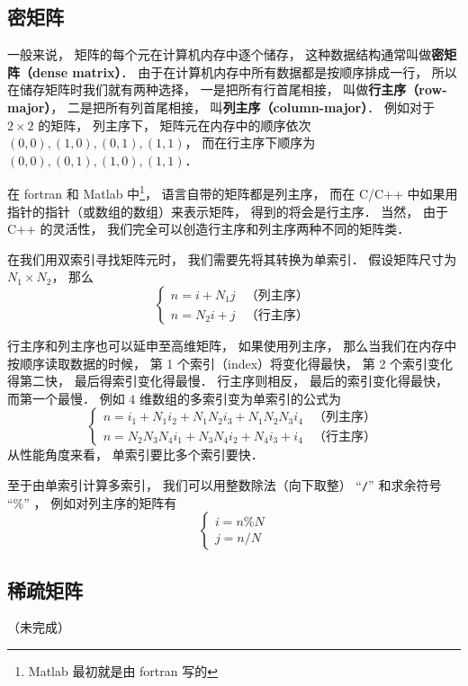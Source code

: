 
\subsection{密矩阵}
一般来说， 矩阵的每个元在计算机内存中逐个储存， 这种数据结构通常叫做\textbf{密矩阵（dense matrix）}． 由于在计算机内存中所有数据都是按顺序排成一行， 所以在储存矩阵时我们就有两种选择， 一是把所有行首尾相接， 叫做\textbf{行主序（row-major）}， 二是把所有列首尾相接， 叫\textbf{列主序（column-major）}． 例如对于 $2 \times 2$ 的矩阵， 列主序下， 矩阵元在内存中的顺序依次 $(0, 0), (1, 0), (0, 1), (1, 1)$， 而在行主序下顺序为 $(0, 0), (0, 1), (1, 0), (1, 1)$．

在 fortran 和 Matlab 中\footnote{Matlab 最初就是由 fortran 写的}， 语言自带的矩阵都是列主序， 而在 C/C++ 中如果用指针的指针（或数组的数组）来表示矩阵， 得到的将会是行主序． 当然， 由于 C++ 的灵活性， 我们完全可以创造行主序和列主序两种不同的矩阵类．

在我们用双索引寻找矩阵元时， 我们需要先将其转换为单索引． 假设矩阵尺寸为 $N_1 \times N_2$， 那么
\begin{equation}
\begin{cases}
n = i + N_1 j  &\text{（列主序）}\\
n = N_2 i + j  &\text{（行主序）}
\end{cases}
\end{equation}

行主序和列主序也可以延申至高维矩阵， 如果使用列主序， 那么当我们在内存中按顺序读取数据的时候， 第 1 个索引（index）将变化得最快， 第 2 个索引变化得第二快， 最后得索引变化得最慢． 行主序则相反， 最后的索引变化得最快， 而第一个最慢． 例如 4 维数组的多索引变为单索引的公式为
\begin{equation}
\begin{cases}
n = i_1 + N_1 i_2 + N_1 N_2 i_3 + N_1 N_2 N_3 i_4  &\text{（列主序）}\\
n = N_2 N_3 N_4 i_1 + N_3 N_4 i_2 + N_4 i_3 + i_4  &\text{（行主序）}
\end{cases}
\end{equation}
从性能角度来看， 单索引要比多个索引要快．

至于由单索引计算多索引， 我们可以用整数除法（向下取整） “\lstinline|/|” 和求余符号 “\%”%
， 例如对列主序的矩阵有
\begin{equation}
\begin{cases}
i = n \% N\\
j = n / N
\end{cases}
\end{equation}

\subsection{稀疏矩阵}

（未完成）
